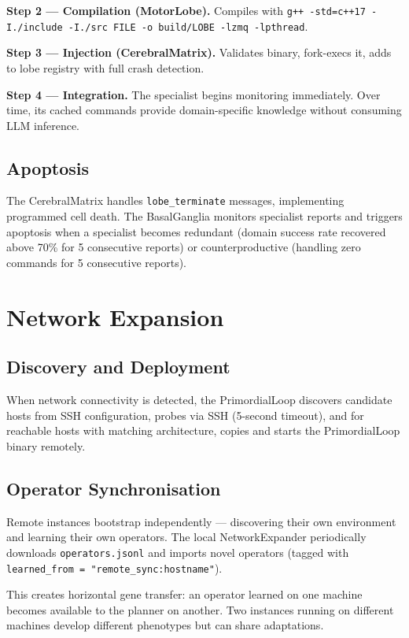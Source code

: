 \documentclass[12pt,a4paper]{report}
\begin{document}
\textbf{Step 2 --- Compilation (MotorLobe).} Compiles with \texttt{g++ -std=c++17 -I./include -I./src FILE -o build/LOBE -lzmq -lpthread}.

\textbf{Step 3 --- Injection (CerebralMatrix).} Validates binary, fork-execs it, adds to lobe registry with full crash detection.

\textbf{Step 4 --- Integration.} The specialist begins monitoring immediately. Over time, its cached commands provide domain-specific knowledge without consuming LLM inference.

\section{Apoptosis}
The CerebralMatrix handles \texttt{lobe\_terminate} messages, implementing programmed cell death. The BasalGanglia monitors specialist reports and triggers apoptosis when a specialist becomes redundant (domain success rate recovered above 70\% for 5 consecutive reports) or counterproductive (handling zero commands for 5 consecutive reports).

\chapter{Network Expansion}

\section{Discovery and Deployment}
When network connectivity is detected, the PrimordialLoop discovers candidate hosts from SSH configuration, probes via SSH (5-second timeout), and for reachable hosts with matching architecture, copies and starts the PrimordialLoop binary remotely.

\section{Operator Synchronisation}
Remote instances bootstrap independently --- discovering their own environment and learning their own operators. The local NetworkExpander periodically downloads \texttt{operators.jsonl} and imports novel operators (tagged with \texttt{learned\_from = "remote\_sync:hostname"}).

This creates horizontal gene transfer: an operator learned on one machine becomes available to the planner on another. Two instances running on different machines develop different phenotypes but can share adaptations.
\end{document}
